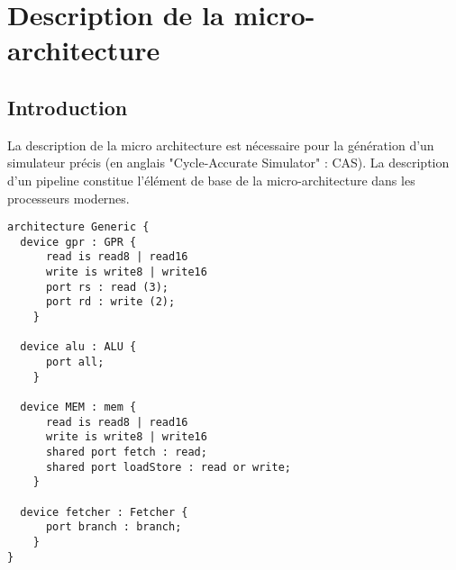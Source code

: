 \chapter{Description de la micro-architecture}
\section{Introduction}
La description de la micro architecture est nécessaire pour la génération d'un simulateur précis (en anglais "Cycle-Accurate Simulator" : CAS). La description d'un pipeline constitue l'élément de base de la micro-architecture dans les processeurs modernes.

\lstset{language=Harmless}
\begin{lstlisting}
architecture Generic {
  device gpr : GPR {
      read is read8 | read16
      write is write8 | write16
      port rs : read (3);
      port rd : write (2);
    }

  device alu : ALU {
      port all;
    }

  device MEM : mem {
      read is read8 | read16
      write is write8 | write16
      shared port fetch : read;
      shared port loadStore : read or write;
    }

  device fetcher : Fetcher {
      port branch : branch;
    }
}
\end{lstlisting}
